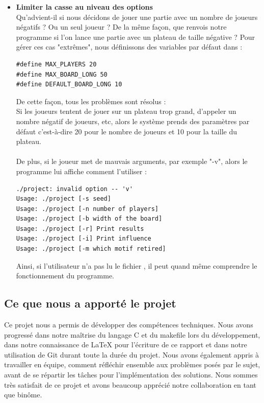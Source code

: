 \documentclass[a4paper]{article}
\begin{document}
\begin{itemize}
      
     \item \textbf{Limiter la casse au niveau des options} \\
Qu'advient-il si nous décidons de jouer une partie avec un nombre de joueurs négatifs ? Ou un seul joueur ? De la même façon, que renvois notre programme si l'on lance une partie avec un plateau de taille négative ? Pour gérer ces cas "extrêmes", nous définissons des variables par défaut dans  :

\begin{lstlisting}
#define MAX_PLAYERS 20
#define MAX_BOARD_LONG 50
#define DEFAULT_BOARD_LONG 10
\end{lstlisting}

De cette façon, tous les problèmes sont résolus : \\
Si les joueurs tentent de jouer sur un plateau trop grand, d'appeler un nombre négatif de joueurs, etc, alors le système prends des paramètres par défaut c'est-à-dire 20 pour le nombre de joueurs et 10 pour la taille du plateau. \\ \\

De plus, si le joueur met de mauvais arguments, par exemple "-v", alors le programme lui affiche comment l'utiliser :

\begin{lstlisting}
./project: invalid option -- 'v'
Usage: ./project [-s seed] 
Usage: ./project [-n number of players] 
Usage: ./project [-b width of the board] 
Usage: ./project [-r] Print results 
Usage: ./project [-i] Print influence
Usage: ./project [-m which motif retired] 
\end{lstlisting}

Ainsi, si l'utilisateur n'a pas lu le fichier , il peut quand même comprendre le fonctionnement du programme.

\end{itemize}



\subsection{Ce que nous a apporté le projet}
Ce projet nous a permis de développer des compétences techniques. Nous avons progressé dans notre maîtrise du langage C et du makefile lors du développement, dans notre connaissance de LaTeX pour l'écriture de ce rapport et dans notre utilisation de Git durant toute la durée du projet. Nous avons également appris à travailler en équipe, comment réfléchir ensemble aux problèmes posés par le sujet, avant de se répartir les tâches pour l'implémentation des solutions. Nous sommes très satisfait de ce projet et avons beaucoup apprécié notre collaboration en tant que binôme.
\end{document}
